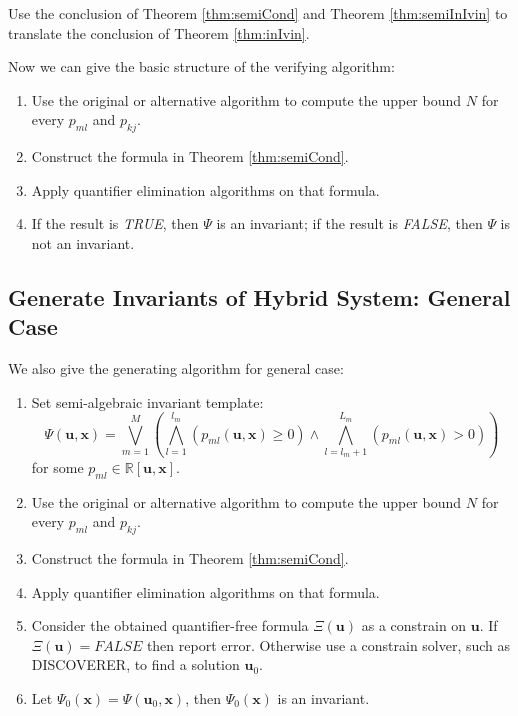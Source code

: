 \documentclass{article}
\begin{document}
\begin{Proof}
Use the conclusion of Theorem \ref{thm:semiCond} and Theorem \ref{thm:semiInIvin} to translate the conclusion of Theorem \ref{thm:inIvin}.
\end{Proof}

Now we can give the basic structure of the verifying algorithm:
\begin{enumerate}
	\item Use the original or alternative algorithm to compute the upper bound $N$ for every $p_{ml}$ and $p_{kj}$.
	\item Construct the formula in Theorem \ref{thm:semiCond}.
	\item Apply quantifier elimination algorithms on that formula.
	\item If the result is \emph{TRUE}, then $\Psi$ is an invariant; if the result is \emph{FALSE}, then $\Psi$ is not an invariant.
\end{enumerate}

\subsection{Generate Invariants of Hybrid System: General Case}
We also give the generating algorithm for general case: 
\begin{enumerate}
	\item Set semi-algebraic invariant template: 
		\begin{equation*}
			\Psi(\boldsymbol{u}, \boldsymbol{x}) = \bigvee_{m=1}^M (\bigwedge_{l=1}^{l_m} (p_{ml}(\boldsymbol{u}, \boldsymbol{x})\geq 0) \wedge \bigwedge_{l=l_m+1}^{L_m} (p_{ml}(\boldsymbol{u}, \boldsymbol{x}) > 0)) 
		\end{equation*}
		for some $p_{ml} \in \mathbb{R}[\boldsymbol{u}, \boldsymbol{x}]$.
	\item Use the original or alternative algorithm to compute the upper bound $N$ for every $p_{ml}$ and $p_{kj}$.
	\item Construct the formula in Theorem \ref{thm:semiCond}.
	\item Apply quantifier elimination algorithms on that formula.
	\item Consider the obtained quantifier-free formula $\Xi(\boldsymbol{u})$ as a constrain on $\boldsymbol{u}$. If $\Xi(\boldsymbol{u}) = \textit{FALSE}$ then report error. Otherwise use a constrain solver, such as DISCOVERER\cite{xia2007discoverer}, to find a solution $\boldsymbol{u}_0$.
	\item Let $\Psi_0(\boldsymbol{x}) = \Psi(\boldsymbol{u}_0, \boldsymbol{x})$, then $\Psi_0(\boldsymbol{x})$ is an invariant.
\end{enumerate}
\end{document}
